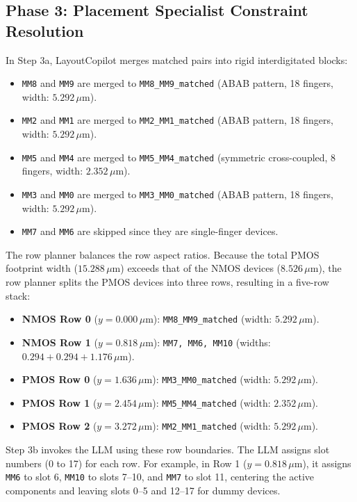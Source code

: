 \subsection{Phase 3: Placement Specialist Constraint Resolution}
In Step 3a, LayoutCopilot merges matched pairs into rigid interdigitated blocks:
\begin{itemize}
    \item \texttt{MM8} and \texttt{MM9} are merged to \texttt{MM8\_MM9\_matched} (ABAB pattern, 18 fingers, width: $5.292\,\mu\text{m}$).
    \item \texttt{MM2} and \texttt{MM1} are merged to \texttt{MM2\_MM1\_matched} (ABAB pattern, 18 fingers, width: $5.292\,\mu\text{m}$).
    \item \texttt{MM5} and \texttt{MM4} are merged to \texttt{MM5\_MM4\_matched} (symmetric cross-coupled, 8 fingers, width: $2.352\,\mu\text{m}$).
    \item \texttt{MM3} and \texttt{MM0} are merged to \texttt{MM3\_MM0\_matched} (ABAB pattern, 18 fingers, width: $5.292\,\mu\text{m}$).
    \item \texttt{MM7} and \texttt{MM6} are skipped since they are single-finger devices.
\end{itemize}
The row planner balances the row aspect ratios. Because the total PMOS footprint width ($15.288\,\mu\text{m}$) exceeds that of the NMOS devices ($8.526\,\mu\text{m}$), the row planner splits the PMOS devices into three rows, resulting in a five-row stack:
\begin{itemize}
    \item \textbf{NMOS Row 0} ($y=0.000\,\mu\text{m}$): \texttt{MM8\_MM9\_matched} (width: $5.292\,\mu\text{m}$).
    \item \textbf{NMOS Row 1} ($y=0.818\,\mu\text{m}$): \texttt{MM7, MM6, MM10} (widths: $0.294 + 0.294 + 1.176\,\mu\text{m}$).
    \item \textbf{PMOS Row 0} ($y=1.636\,\mu\text{m}$): \texttt{MM3\_MM0\_matched} (width: $5.292\,\mu\text{m}$).
    \item \textbf{PMOS Row 1} ($y=2.454\,\mu\text{m}$): \texttt{MM5\_MM4\_matched} (width: $2.352\,\mu\text{m}$).
    \item \textbf{PMOS Row 2} ($y=3.272\,\mu\text{m}$): \texttt{MM2\_MM1\_matched} (width: $5.292\,\mu\text{m}$).
\end{itemize}

Step 3b invokes the LLM using these row boundaries. The LLM assigns slot numbers (0 to 17) for each row. For example, in Row 1 ($y=0.818\,\mu\text{m}$), it assigns \texttt{MM6} to slot 6, \texttt{MM10} to slots 7--10, and \texttt{MM7} to slot 11, centering the active components and leaving slots 0--5 and 12--17 for dummy devices.

